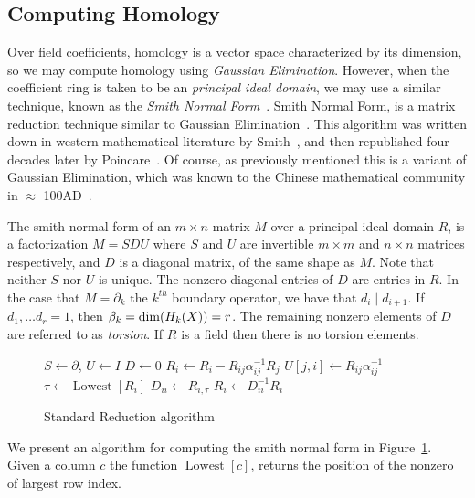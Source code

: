 \subsection{Computing Homology}
Over field coefficients, homology is a vector space characterized by its dimension, so we may compute homology using \emph{Gaussian Elimination}. However, when the coefficient ring is taken to be an \emph{principal ideal domain}, we may use a similar technique, known as the \emph{Smith Normal Form}~\cite{uhlig}. Smith Normal Form, is a matrix reduction technique similar to Gaussian Elimination~\cite{uhlig}. This algorithm was written down in western mathematical literature by Smith~\cite{smith}, and then republished four decades later by Poincare~\cite{poincare-smith}. Of course, as previously mentioned this is a variant of Gaussian Elimination, which was known to the Chinese mathematical community in $\approx$ 100AD~\cite{chinese-ge}.

The smith normal form of an $m \times n$ matrix $M$ over a principal ideal domain $R$, is a factorization $M = SDU$ where $S$ and $U$ are invertible $m \times m$ and $n \times n$ matrices respectively, and $D$ is a diagonal matrix, of the same shape as $M$. Note that neither $S$ nor $U$ is unique. The nonzero diagonal entries of $D$ are entries in $R$. In the case that $M = \partial_k$ the $k^{th}$  boundary operator, we have that $d_i \mid d_{i+1}$. If $d_1, \ldots d_r = 1$, then $\beta_k = \dim(H_k(X)) = r$. The remaining nonzero elements of $D$ are referred to as \emph{torsion}. If $R$ is a field then there is no torsion elements. 
\begin{figure}
\begin{codebox}
\li $S \gets \partial$, $U \gets I$
\li $D \gets 0$
\li {} 
\li \Do 
\li {}
\li \Do
\li   $R_i \gets R_i - R_{ij}\alpha^{-1}_{ij}R_j$
\li   $U[j,i] \gets R_{ij}\alpha^{-1}_{ij}$
    \End
\li   $\tau \gets \operatorname{Lowest}[R_i]$
\li   $D_{ii} \gets R_{i,\tau}$
\li   $R_{i} \gets D_{ii}^{-1}R_{i}$
\End
\end{codebox}
\caption{Standard Reduction algorithm}
\label{alg:smith}
\end{figure}

We present an algorithm for computing the smith normal form in Figure~\ref{alg:smith}. Given a column $c$ the function $\operatorname{Lowest}[c]$, 
returns the position of the nonzero of largest row index.

